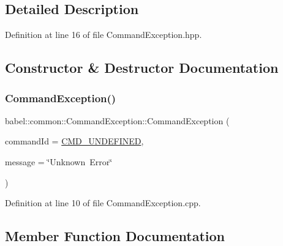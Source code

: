 \subsection{Detailed Description}


Definition at line 16 of file Command\+Exception.\+hpp.



\subsection{Constructor \& Destructor Documentation}
\mbox{\label{classbabel_1_1common_1_1_command_exception_a5804b444c64ce4dece4388ea290f28be}} 
\subsubsection{\texorpdfstring{Command\+Exception()}{CommandException()}}
{\footnotesize\ttfamily babel\+::common\+::\+Command\+Exception\+::\+Command\+Exception (\begin{DoxyParamCaption}\item[{\mbox{\hyperlink{namespacebabel_1_1common_a2d31f246c776da6bf656bd71e86cbb2c}{Command\+Name}}}]{command\+Id = {\ttfamily \mbox{\hyperlink{namespacebabel_1_1common_a2d31f246c776da6bf656bd71e86cbb2ca452461e4930e2af5d48e5d2f3eecf98f}{C\+M\+D\+\_\+\+U\+N\+D\+E\+F\+I\+N\+ED}}},  }\item[{const std\+::string \&}]{message = {\ttfamily \char`\"{}Unknown~Error\char`\"{}} }\end{DoxyParamCaption})\hspace{0.3cm}{\ttfamily [explicit]}}



Definition at line 10 of file Command\+Exception.\+cpp.



\subsection{Member Function Documentation}
\mbox{\label{classbabel_1_1common_1_1_command_exception_aed608cb84fccdc4bb56a072fb7a8a58c}} 
